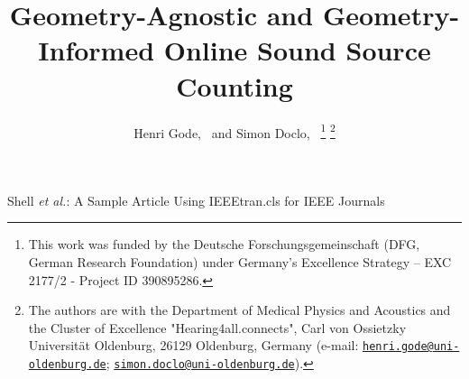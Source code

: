 \documentclass[lettersize,journal]{IEEEtran}
\begin{document}
\title{Geometry-Agnostic and Geometry-Informed Online Sound Source Counting}

\author{
  Henri Gode,~
  and Simon Doclo,~%
  \thanks{
    This work was funded by the Deutsche Forschungsgemeinschaft (DFG, German Research Foundation) under
    Germany's Excellence Strategy – EXC 2177/2 - Project ID 390895286.
  }%
  \thanks{
    The authors are with the Department of Medical Physics and Acoustics
    and the Cluster of Excellence "Hearing4all.connects", Carl von Ossietzky Universität Oldenburg, 26129 Oldenburg, Germany
    (e-mail: \href{mailto:henri.gode@uni-oldenburg.de}{\texttt{henri.gode@uni-oldenburg.de}};
    \href{mailto:simon.doclo@uni-oldenburg.de}{\texttt{simon.doclo@uni-oldenburg.de}}).
  }%


}

%
{Shell \MakeLowercase{\textit{et al.}}: A Sample Article Using IEEEtran.cls for IEEE Journals}


\maketitle
\end{document}
